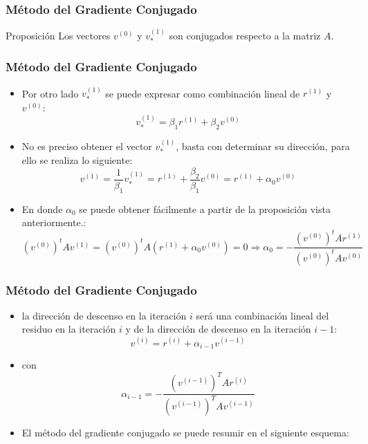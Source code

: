 \documentclass[10pt]{beamer}
\begin{document}
\begin{frame}
  \frametitle{M\'etodo del Gradiente Conjugado}
  \begin{block}{Proposici\'on}
    Los vectores $v^{(0)}$ y $v_*^{(1)}$ son conjugados respecto a la matriz $A$.    
  \end{block}
\end{frame}
\begin{frame}
  \frametitle{M\'etodo del Gradiente Conjugado}
  \begin{itemize}
    \item<1->Por otro lado $v^{(1)}_*$ se puede expresar como combinaci\'on lineal de $r^{(1)}$ y $v^{(0)}$:
    $$
    v^{(1)}_* = \beta_1r^{(1)}+\beta_2v^{(0)}
    $$
    \item<2-> No es preciso obtener el vector $v^{(1)}_*$, basta con determinar su direcci\'on, para ello se realiza lo siguiente:
    $$
    v^{(1)} = \frac{1}{\beta_1}v^{(1)}_* = r^{(1)} + \frac{\beta_2}{\beta_1}v^{(0)} = r^{(1)} + \alpha_0v^{(0)} 
    $$
    \item<3->En donde $\alpha_0$ se puede obtener f\'acilmente a partir de la proposici\'on vista anteriormente.:
    $$
    (v^{(0)})^tAv^{(1)} = (v^{(0)})^tA( r^{(1)} + \alpha_0v^{(0)} ) = 0 \Rightarrow \alpha_0=-\frac{(v^{(0)})^tAr^{(1)}}{(v^{(0)})^tAv^{(0)}}
    $$
  \end{itemize}
\end{frame}
\begin{frame}
  \frametitle{M\'etodo del Gradiente Conjugado}
  \begin{itemize}
    \item<1->la direcci\'on de descenso en la iteraci\'on $i$ ser\'a una combinaci\'on lineal del residuo en la iteraci\'on $i$ y de la direcci\'on de descenso en la iteraci\'on $i - 1$:
    $$
    v^{(i)} = r^{(i)} + \alpha_{i-1}v^{(i-1)}
    $$
    \item<2->con
    $$
    \alpha_{i-1} = -\displaystyle\frac{(v^{(i-1)})^TAr^{(i)}}{(v^{(i-1)})^TAv^{(i-1)}}
    $$
    \item<3->El m\'etodo del gradiente conjugado se puede resumir en el siguiente esquema:
  \end{itemize}
\end{frame}
\end{document}
